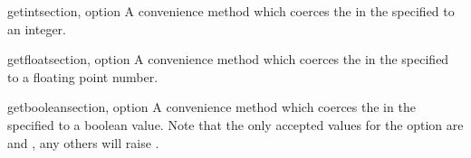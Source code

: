 \begin{methoddesc}{getint}{section, option}
A convenience method which coerces the  in the specified
 to an integer.
\end{methoddesc}

\begin{methoddesc}{getfloat}{section, option}
A convenience method which coerces the  in the specified
 to a floating point number.
\end{methoddesc}

\begin{methoddesc}{getboolean}{section, option}
A convenience method which coerces the  in the specified
 to a boolean value.  Note that the only accepted values
for the option are  and , any others will raise
.
\end{methoddesc}
